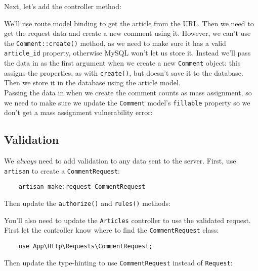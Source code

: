 Next, let's add the controller method:


We'll use route model binding to get the article from the URL. Then we need to get the request data and create a new comment using it. However, we can't use the \texttt{Comment::create()} method, as we need to make sure it has a valid \texttt{article\_id} property, otherwise MySQL won't let us store it. Instead we'll pass the data in as the first argument when we create a new \texttt{Comment} object: this assigns the properties, as with \texttt{create()}, but doesn't save it to the database. Then we store it in the database using the article model.
\\

Passing the data in when we create the comment counts as mass assignment, so we need to make sure we update the \texttt{Comment} model's \texttt{fillable} property so we don't get a mass assignment vulnerability error:



\subsection{Validation}

We \textit{always} need to add validation to any data sent to the server. First, use \texttt{artisan} to create a \texttt{CommentRequest}:

\begin{verbatim}
    artisan make:request CommentRequest
\end{verbatim}

Then update the \texttt{authorize()} and \texttt{rules()} methods:


You'll also need to update the \texttt{Articles} controller to use the validated request. First let the controller know where to find the \texttt{CommentRequest} class:

\begin{verbatim}
    use App\Http\Requests\CommentRequest;
\end{verbatim}

Then update the type-hinting to use \texttt{CommentRequest} instead of \texttt{Request}:



